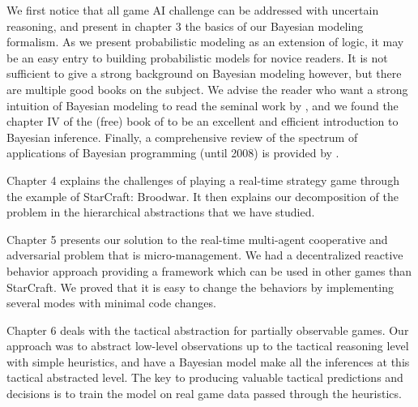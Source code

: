 We first notice that all game AI challenge can be addressed with uncertain reasoning, and present in chapter 3 the basics of our Bayesian modeling formalism. As we present probabilistic modeling as an extension of logic, it may be an easy entry to building probabilistic models for novice readers. It is not sufficient to give a strong background on Bayesian modeling however, but there are multiple good books on the subject. We advise the reader who want a strong intuition of Bayesian modeling to read the seminal work by \cite{Jaynes}, and we found the chapter IV of the (free) book of \cite{MacKay} to be an excellent and efficient introduction to Bayesian inference. Finally, a comprehensive review of the spectrum of applications of Bayesian programming (until 2008) is provided by \citep{PRDMSMS}.

Chapter 4 explains the challenges of playing a real-time strategy game through the example of StarCraft: Broodwar. It then explains our decomposition of the problem in the hierarchical abstractions that we have studied.

Chapter 5 presents our solution to the real-time multi-agent cooperative and adversarial problem that is micro-management. We had a decentralized reactive behavior approach providing a framework which can be used in other games than StarCraft. We proved that it is easy to change the behaviors by implementing several modes with minimal code changes.

Chapter 6 deals with the tactical abstraction for partially observable games. Our approach was to abstract low-level observations up to the tactical reasoning level with simple heuristics, and have a Bayesian model make all the inferences at this tactical abstracted level. The key to producing valuable tactical predictions and decisions is to train the model on real game data passed through the heuristics.

